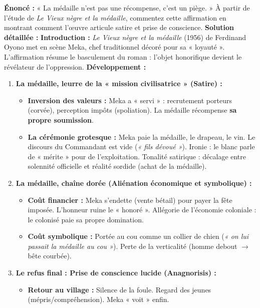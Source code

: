 \documentclass[11pt]{article}
\newcommand{\cle}[1]{{\popxbold\color{popdark}#1}}
\begin{document}
\begin{exoresolu}
    \textbf{Énoncé :} « La médaille n'est pas une récompense, c'est un piège. » À partir de l'étude de \emph{Le Vieux nègre et la médaille}, commentez cette affirmation en montrant comment l'œuvre articule satire et prise de conscience.
    \tcblower
    \textbf{Solution détaillée :}
    \textbf{Introduction :} \emph{Le Vieux nègre et la médaille} (1956) de Ferdinand Oyono met en scène Meka, chef traditionnel décoré pour sa « loyauté ». L'affirmation résume le basculement du roman : l'objet honorifique devient le révélateur de l'oppression.
    \textbf{Développement :}
    \begin{enumerate}
        \item \textbf{La médaille, leurre de la « mission civilisatrice » (Satire) :}
            \begin{itemize}
                \item \textbf{Inversion des valeurs :} Meka a « servi » : recrutement porteurs (corvée), perception impôts (spoliation). La médaille récompense \textbf{sa propre soumission}.
                \item \textbf{La cérémonie grotesque :} Meka paie la médaille, le drapeau, le vin. Le discours du Commandant est vide (\emph{« fils dévoué »}). Ironie : le blanc parle de « mérite » pour de l'exploitation. Tonalité \cle{satirique} : décalage entre solennité officielle et réalité sordide (achat de la médaille).
            \end{itemize}
        \item \textbf{La médaille, chaîne dorée (Aliénation économique et symbolique) :}
            \begin{itemize}
                \item \textbf{Coût financier :} Meka s'endette (vente bétail) pour payer la fête imposée. L'honneur ruine le « honoré ». Allégorie de l'économie coloniale : le colonisé paie sa propre domination.
                \item \textbf{Coût symbolique :} Portée au cou comme un collier de chien (\emph{« on lui passait la médaille au cou »}). Perte de la verticalité (homme debout $\rightarrow$ bête courbée).
            \end{itemize}
        \item \textbf{Le refus final : Prise de conscience lucide (Anagnorisis) :}
            \begin{itemize}
                \item \textbf{Retour au village :} Silence de la foule. Regard des jeunes (mépris/compréhension). Meka « voit » enfin.

\end{itemize}
\end{enumerate}
\end{exoresolu}
\end{document}
